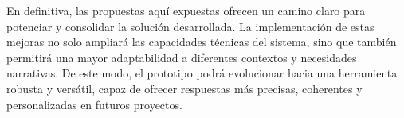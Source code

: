 En definitiva, las propuestas aquí expuestas ofrecen un camino claro para potenciar
y consolidar la solución desarrollada.
La implementación de estas mejoras no solo ampliará las capacidades técnicas del sistema,
sino que también permitirá una mayor adaptabilidad a diferentes contextos
y necesidades narrativas.
De este modo, el prototipo podrá evolucionar hacia una herramienta robusta y versátil,
capaz de ofrecer respuestas más precisas, coherentes y personalizadas en futuros proyectos.
